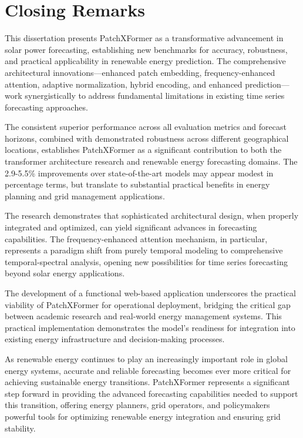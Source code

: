 \documentclass[12pt]{uomthesis}
\begin{document}
\section{Closing Remarks}

This dissertation presents PatchXFormer as a transformative advancement in solar power forecasting, establishing new benchmarks for accuracy, robustness, and practical applicability in renewable energy prediction. The comprehensive architectural innovations—enhanced patch embedding, frequency-enhanced attention, adaptive normalization, hybrid encoding, and enhanced prediction—work synergistically to address fundamental limitations in existing time series forecasting approaches.

The consistent superior performance across all evaluation metrics and forecast horizons, combined with demonstrated robustness across different geographical locations, establishes PatchXFormer as a significant contribution to both the transformer architecture research and renewable energy forecasting domains. The 2.9-5.5\% improvements over state-of-the-art models may appear modest in percentage terms, but translate to substantial practical benefits in energy planning and grid management applications.

The research demonstrates that sophisticated architectural design, when properly integrated and optimized, can yield significant advances in forecasting capabilities. The frequency-enhanced attention mechanism, in particular, represents a paradigm shift from purely temporal modeling to comprehensive temporal-spectral analysis, opening new possibilities for time series forecasting beyond solar energy applications.

The development of a functional web-based application underscores the practical viability of PatchXFormer for operational deployment, bridging the critical gap between academic research and real-world energy management systems. This practical implementation demonstrates the model's readiness for integration into existing energy infrastructure and decision-making processes.

As renewable energy continues to play an increasingly important role in global energy systems, accurate and reliable forecasting becomes ever more critical for achieving sustainable energy transitions. PatchXFormer represents a significant step forward in providing the advanced forecasting capabilities needed to support this transition, offering energy planners, grid operators, and policymakers powerful tools for optimizing renewable energy integration and ensuring grid stability.
\end{document}
